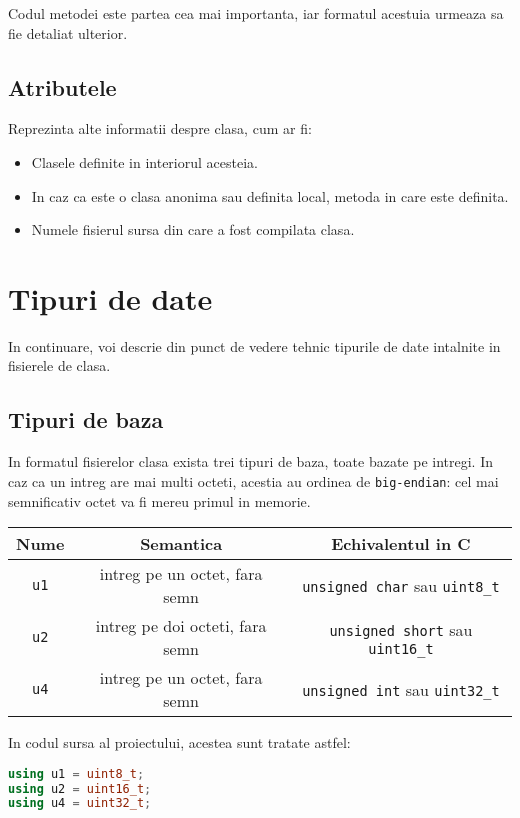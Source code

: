 Codul metodei este partea cea mai importanta, iar formatul acestuia
urmeaza sa fie detaliat ulterior.

\subsection{Atributele}

Reprezinta alte informatii despre clasa, cum ar fi:
\begin{itemize}
	\item Clasele definite in interiorul acesteia.
	\item In caz ca este o clasa anonima sau definita local, metoda in care este definita.
	\item Numele fisierul sursa din care a fost compilata clasa.
\end{itemize}

\section{Tipuri de date}

In continuare, voi descrie din punct de vedere tehnic tipurile de date
intalnite in fisierele de clasa.

\subsection{Tipuri de baza}

In formatul fisierelor clasa exista trei tipuri de baza, toate bazate pe
intregi. In caz ca un intreg are mai multi octeti, acestia au ordinea de
\texttt{big-endian}: cel mai semnificativ octet va fi mereu primul in
memorie.

\begin{longtable}[]{@{}ccc@{}}
	\toprule
	Nume        & Semantica                       & Echivalentul in C\tabularnewline
	\midrule
	\endhead
	\texttt{u1} & intreg pe un octet, fara semn   & \texttt{unsigned\ char}
	sau \texttt{uint8\_t}\tabularnewline
	\texttt{u2} & intreg pe doi octeti, fara semn & \texttt{unsigned\ short}
	sau \texttt{uint16\_t}\tabularnewline
	\texttt{u4} & intreg pe un octet, fara semn   & \texttt{unsigned\ int} sau
	\texttt{uint32\_t}\tabularnewline
	\bottomrule
\end{longtable}

In codul sursa al proiectului, acestea sunt tratate astfel:

\begin{lstlisting}[language=C++]
using u1 = uint8_t;
using u2 = uint16_t;
using u4 = uint32_t;
\end{lstlisting}


